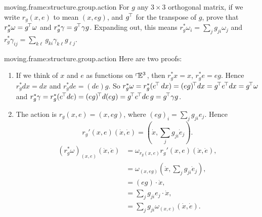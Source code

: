 \begin{problem}{moving.frame:structure.group.action}
For \(g\) any \(3 \times 3\) orthogonal matrix, if we write \(r_g(x,e)\) to mean \((x,eg)\), and \(g^{\!\top}\) for the transpose of \(g\), prove that \(r_g^* \omega=g^{\!\top}\omega\) and \(r_g^* \gamma = g^{\!\top}\gamma g\).
Expanding out, this means \(r_g^*\omega_i = \sum_j g_{ji} \omega_j\) and \(r_g^*\gamma_{ij} = \sum_{k\ell} g_{ki} \gamma_{k\ell} g_{\ell j}\).
\end{problem}
\begin{answer}{moving.frame:structure.group.action}
Here are two proofs:
\begin{enumerate}
\item
If we think of \(x\) and \(e\) as functions on \(\left\ulcorner\!\mathbb{E}^{3}\right.\), then \(r_g^* x = x\), \(r_g^* e = eg\).
Hence \(r_g^* dx=dx\) and \(r_g^* de = (de)g\).
So \(r_g^* \omega = r_g^* (e^{\!\top}\, dx)= (eg)^{\!\top} dx = g^{\!\top} e^{\!\top} dx = g^{\!\top} \omega\) and \(r_g^*\gamma = r_g^* (e^{\!\top} de) = (eg)^{\!\top} d(eg)=g^{\!\top} e^{\!\top} de \, g=g^{\!\top} \gamma g\).
\item
The action is \(r_g(x,e)=(x,eg)\), where \((eg)_i = \sum_j g_{ji} e_j\).
Hence
\[
r_g'(x,e)(\dot{x},\dot{e})=(\dot{x},\sum_j g_{ji} \dot{e}_j).
\]
\begin{align*}
(r_g^* \omega)_{(x,e)}(\dot{x},\dot{e})
&=
\omega_{r_g(x,e)}r_g'(x,e)(\dot{x},\dot{e}),
\\
&=
\omega_{(x,eg)}(\dot{x},\sum_j g_{ji} \dot{e}_j),
\\
&=
(eg) \cdot \dot{x},
\\
&= \sum_j g_{ji} e_j \cdot \dot{x},
\\
&=
\sum_j g_{ji} \omega_{(x,e)}(\dot{x},\dot{e}).
\end{align*}
\end{enumerate}
\end{answer}

